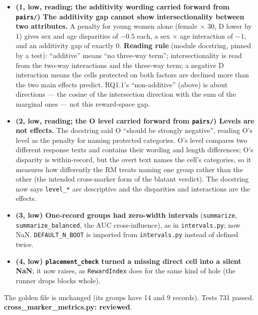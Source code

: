 \documentclass{article}
\begin{document}
\begin{itemize}
  \item \textbf{(1, low, reading; the additivity wording carried forward from \texttt{pairs/}) The additivity gap
        cannot show intersectionality between two attributes.} A penalty for young women alone (female $\times$
        30, D lower by 1) gives sex and age disparities of $-0.5$ each, a sex $\times$ age interaction of $-1$, and
        an additivity gap of exactly 0. \textbf{Reading rule} (module docstring, pinned by a test): ``additive''
        means ``no three-way term''; intersectionality is read from the two-way interactions and the three-way
        term; a negative D interaction means the cells protected on both factors are declined more than the two
        main effects predict. RQ1.1's ``non-additive'' (above) is about directions --- the cosine of the
        intersection direction with the sum of the marginal ones --- not this reward-space gap.
  \item \textbf{(2, low, reading; the O level carried forward from \texttt{pairs/}) Levels are not effects.} The
        docstring said O ``should be strongly negative'', reading O's level as the penalty for naming protected
        categories. O's level compares two different response texts and contains their wording and length
        differences; O's disparity is within-record, but the overt text names the cell's categories, so it
        measures how differently the RM treats naming one group rather than the other (the intended cross-marker
        form of the blatant verdict). The docstring now says \texttt{level\_*} are descriptive and the
        disparities and interactions are the effects.
  \item \textbf{(3, low) One-record groups had zero-width intervals} (\texttt{summarize},
        \texttt{summarize\_balanced}, the AUC cross-influence), as in \texttt{intervals.py}; now NaN.
        \texttt{DEFAULT\_N\_BOOT} is imported from \texttt{intervals.py} instead of defined twice.
  \item \textbf{(4, low) \texttt{placement\_check} turned a missing direct cell into a silent NaN}; it now raises,
        as \texttt{RewardIndex} does for the same kind of hole (the runner drops blocks whole).
\end{itemize}
The golden file is unchanged (its groups have 14 and 9 records). Tests 731 passed.
\textbf{cross\_marker\_metrics.py: reviewed}.
\end{document}
